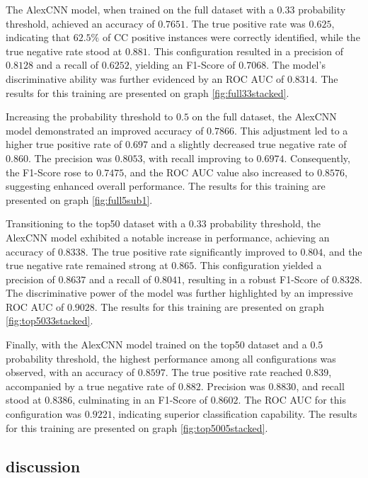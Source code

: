 \documentclass{pracalicmgr}
\begin{document}
\newpage

The AlexCNN model, when trained on the full dataset with a $0.33$ probability threshold, achieved an accuracy of $0.7651$. The true positive rate was $0.625$, indicating that $62.5\%$ of CC positive instances were correctly identified, while the true negative rate stood at $0.881$. This configuration resulted in a precision of $0.8128$ and a recall of $0.6252$, yielding an F1-Score of $0.7068$. The model's discriminative ability was further evidenced by an ROC AUC of $0.8314$. The results for this training are presented on graph \ref{fig:full33stacked}.

Increasing the probability threshold to $0.5$ on the full dataset, the AlexCNN model demonstrated an improved accuracy of $0.7866$. This adjustment led to a higher true positive rate of $0.697$ and a slightly decreased true negative rate of $0.860$. The precision was $0.8053$, with recall improving to $0.6974$. Consequently, the F1-Score rose to $0.7475$, and the ROC AUC value also increased to $0.8576$, suggesting enhanced overall performance. The results for this training are presented on graph \ref{fig:full5sub1}.

Transitioning to the top50 dataset with a $0.33$ probability threshold, the AlexCNN model exhibited a notable increase in performance, achieving an accuracy of $0.8338$. The true positive rate significantly improved to $0.804$, and the true negative rate remained strong at $0.865$. This configuration yielded a precision of $0.8637$ and a recall of $0.8041$, resulting in a robust F1-Score of $0.8328$. The discriminative power of the model was further highlighted by an impressive ROC AUC of $0.9028$. The results for this training are presented on graph \ref{fig:top5033stacked}.

Finally, with the AlexCNN model trained on the top50 dataset and a $0.5$ probability threshold, the highest performance among all configurations was observed, with an accuracy of $0.8597$. The true positive rate reached $0.839$, accompanied by a true negative rate of $0.882$. Precision was $0.8830$, and recall stood at $0.8386$, culminating in an F1-Score of $0.8602$. The ROC AUC for this configuration was $0.9221$, indicating superior classification capability. The results for this training are presented on graph \ref{fig:top5005stacked}.




\subsection{discussion}
\end{document}
